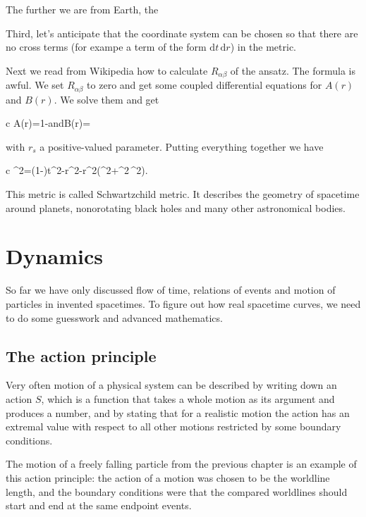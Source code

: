 \documentclass[11pt,oneside%
]{memoir}
\newenvironment{eqna}{\begin{IEEEeqnarray*}{c}}{\end{IEEEeqnarray*}\ignorespacesafterend}
\newcommand{\andd}{\qquad\textrm{and}\qquad}
\newcommand{\dd}{\mathrm{d}}
\begin{document}
The further we are from Earth, the 


 Third, let's anticipate that the coordinate system can be chosen so that there are no cross terms (for exampe a term of the form \(\dd t\,\dd r\)) in the metric.





Next we read from Wikipedia how to calculate \(R_{\alpha\beta}\) of the ansatz. The formula is awful. We set \(R_{\alpha\beta}\) to zero and get some coupled differential equations for \(A(r)\) and \(B(r)\). We solve them and get
\begin{eqna}
A(r)=1-\andd B(r)=
\end{eqna}
with \(r_s\) a positive-valued parameter. Putting everything together we have
\begin{eqna}
\dd\tau^2=\left(1-\right)\dd t^2-\dd r^2-r^2\left(\dd\theta^2+\sin^2\theta\,\dd\phi^2\right).
\end{eqna}
This metric is called Schwartzchild metric. It describes the geometry of spacetime around planets, nonorotating black holes and many other astronomical bodies.





\chapter{Dynamics}

So far we have only discussed flow of time, relations of events and motion of particles in invented spacetimes. To figure out how real spacetime curves, we need to do some guesswork and advanced mathematics.

\section{The action principle}

Very often motion of a physical system can be described by writing down an action \(S\), which is a function that takes a whole motion as its argument and produces a number, and by stating that for a realistic motion the action has an extremal value with respect to all other motions restricted by some boundary conditions.

The motion of a freely falling particle from the previous chapter is an example of this action principle: the action of a motion was chosen to be the worldline length, and the boundary conditions were that the compared worldlines should start and end at the same endpoint events.
\end{document}
